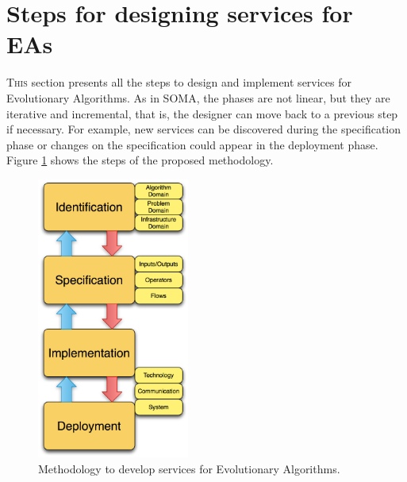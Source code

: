 






\section{Steps for designing services for EAs}
\lettrine{T}{his} section presents all the steps to design and implement services for Evolutionary Algorithms.
 As in SOMA, the phases are not linear, but they are iterative and incremental, that is, the designer can move back to a previous step if necessary. For example,
 new services can be discovered during the specification phase or changes on the specification could appear in the deployment phase. Figure \ref{fig:distributed:methodology} shows the steps of the proposed methodology.

\begin{figure}
\centering
\includegraphics[width=5cm]{gfx/soaea/methodology.jpg}
\caption{Methodology to develop services for Evolutionary Algorithms.}
\label{fig:distributed:methodology}
\end{figure}

